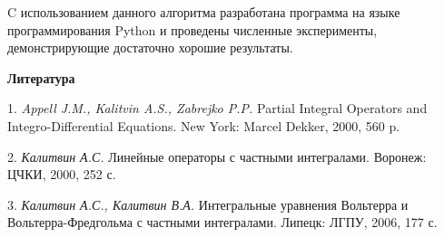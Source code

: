 C использованием данного алгоритма разработана программа на языке программирования Python и проведены численные эксперименты, демонстрирующие достаточно хорошие результаты.


\smallskip \centerline {\bf Литература} \nopagebreak

1. {\it Appell J.M., Kalitvin A.S., Zabrejko P.P.} Partial Integral Operators and Integro-Differential Equations. New York: Marcel Dekker, 2000, 560 p.

2. {\it Калитвин А.С.} Линейные операторы с частными интегралами. Воронеж: ЦЧКИ, 2000, 252 с.

3. {\it Калитвин А.С., Калитвин В.А.} Интегральные уравнения Вольтерра и Вольтерра-Фредгольма с частными интегралами. Липецк: ЛГПУ, 2006, 177 с.

